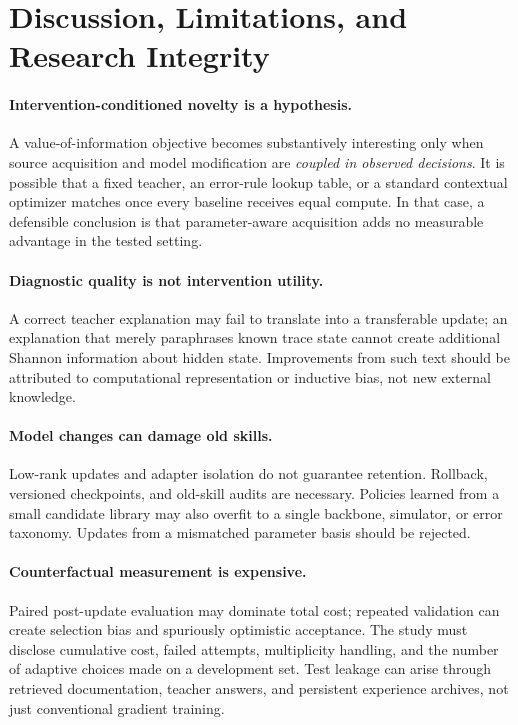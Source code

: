 \section{Discussion, Limitations, and Research Integrity}
\label{sec:discussion}

\paragraph{Intervention-conditioned novelty is a hypothesis.}
A value-of-information objective becomes substantively interesting
only when source acquisition and model modification are
\emph{coupled in observed decisions}. It is possible that a fixed
teacher, an error-rule lookup table, or a standard contextual
optimizer matches \spear{} once every baseline receives equal
compute. In that case, a defensible conclusion is that
parameter-aware acquisition adds no measurable advantage in the
tested setting.

\paragraph{Diagnostic quality is not intervention utility.}
A correct teacher explanation may fail to translate into a
transferable update; an explanation that merely paraphrases
known trace state cannot create additional Shannon information
about hidden state. Improvements from such text should be
attributed to computational representation or inductive bias,
not new external knowledge.

\paragraph{Model changes can damage old skills.}
Low-rank updates and adapter isolation do not guarantee retention.
Rollback, versioned checkpoints, and old-skill audits are necessary.
Policies learned from a small candidate library may also overfit
to a single backbone, simulator, or error taxonomy. Updates from
a mismatched parameter basis should be rejected.

\paragraph{Counterfactual measurement is expensive.}
Paired post-update evaluation may dominate total cost; repeated
validation can create selection bias and spuriously optimistic
acceptance. The study must disclose cumulative cost, failed
attempts, multiplicity handling, and the number of adaptive
choices made on a development set. Test leakage can arise through
retrieved documentation, teacher answers, and persistent
experience archives, not just conventional gradient training.

